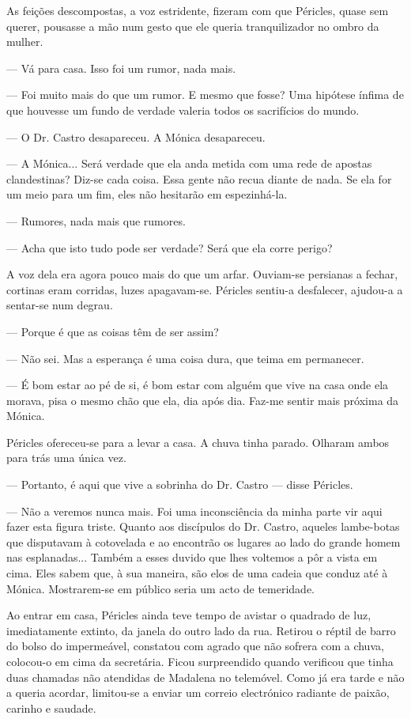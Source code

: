 As feições descompostas, a voz estridente, fizeram com que Péricles,
quase sem querer, pousasse a mão num gesto que ele queria tranquilizador
no ombro da mulher.

--- Vá para casa. Isso foi um rumor, nada mais.

--- Foi muito mais do que um rumor. E mesmo que fosse? Uma hipótese ínfima
  de que houvesse um fundo de verdade valeria todos os sacrifícios do
  mundo.

--- O Dr. Castro desapareceu. A Mónica desapareceu.

--- A Mónica... Será verdade que ela anda metida com uma rede de apostas
  clandestinas? Diz-se cada coisa. Essa gente não recua diante de
  nada. Se ela for um meio para um fim, eles não hesitarão em
  espezinhá-la.

--- Rumores, nada mais que rumores.

--- Acha que isto tudo pode ser verdade? Será que ela corre perigo?


A voz dela era agora pouco mais do que um arfar. Ouviam-se persianas a fechar, cortinas eram corridas, luzes apagavam-se.
Péricles sentiu-a desfalecer, ajudou-a a sentar-se num degrau.

--- Porque é que as coisas têm de ser assim?

--- Não sei. Mas a esperança é uma coisa dura, que teima em permanecer.

--- É bom estar ao pé de si, é bom estar com alguém que vive na casa onde
  ela morava, pisa o mesmo chão que ela, dia após dia. Faz-me sentir
  mais próxima da Mónica.

Péricles ofereceu-se para a levar a casa. A chuva tinha parado. Olharam
ambos para trás uma única vez.

--- Portanto, é aqui que vive a sobrinha do Dr. Castro --- disse Péricles.

--- Não a veremos nunca mais. Foi uma inconsciência da minha parte vir
  aqui fazer esta figura triste. Quanto aos discípulos do Dr. Castro,
  aqueles lambe-botas que disputavam à cotovelada e ao encontrão os
  lugares ao lado do grande homem nas esplanadas... Também a esses
  duvido que lhes voltemos a pôr a vista em cima. Eles sabem que, à sua
  maneira, são elos de uma cadeia que conduz até à Mónica. Mostrarem-se
  em público seria um acto de temeridade.


Ao entrar em casa, Péricles ainda teve tempo de avistar o quadrado de
luz, imediatamente extinto, da janela do outro lado da rua. Retirou o
réptil de barro do bolso do impermeável, constatou com agrado que não
sofrera com a chuva, colocou-o em cima da secretária. Ficou surpreendido
quando verificou que tinha duas chamadas não atendidas de Madalena no
telemóvel. Como já era tarde e não a queria acordar, limitou-se a enviar
um correio electrónico radiante de paixão, carinho e saudade.

